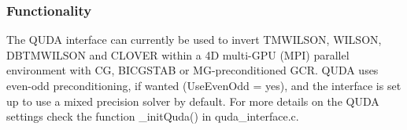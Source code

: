 \subsubsection{Functionality}
The QUDA interface can currently be used to invert {\ttfamily TMWILSON, WILSON, DBTMWILSON} and {\ttfamily CLOVER} within a 4D multi-GPU (MPI) parallel environment with CG, BICGSTAB or MG-preconditioned GCR. QUDA uses even-odd preconditioning, if wanted ({\ttfamily UseEvenOdd = yes}), and the interface is set up to use a mixed precision solver by default. For more details on the QUDA settings check the function {\ttfamily \_initQuda()} in {\ttfamily quda\_interface.c}.



